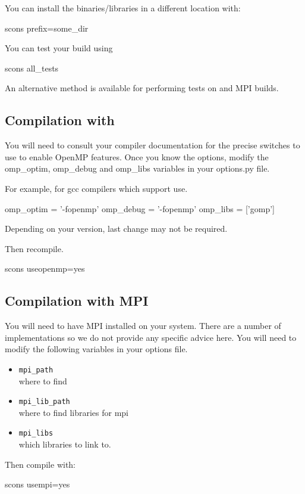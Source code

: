You can install the binaries/libraries in a different location with:
\begin{shellCode}
 scons prefix=some_dir
\end{shellCode}

You can test your build using 
\begin{shellCode}
scons all_tests
\end{shellCode}
An alternative method is available for performing tests on \openmp and MPI builds.

\subsection{Compilation with \openmp}
You will need to consult your compiler documentation for the precise switches to use to enable OpenMP features.
Once you know the options, modify the omp_optim, omp_debug and omp_libs variables in your options.py file.

For example, for gcc compilers which support \openmp use.
\begin{shellCode}
omp_optim		= '-fopenmp'
omp_debug		= '-fopenmp'
omp_libs		= ['gomp']
\end{shellCode}
Depending on your version, last change may not be required.

Then recompile.
\begin{shellCode}
 scons useopenmp=yes
\end{shellCode}

\subsection{Compilation with MPI}
You will need to have MPI installed on your system.
There are a number of implementations so we do not provide any specific advice here.
You will need to modify the following variables in your options file.
\begin{itemize}
 \item \texttt{mpi_path} \\
	where to find 
\item \texttt{mpi_lib_path} \\
	where to find libraries for mpi
\item \texttt{mpi_libs} \\
	which libraries to link to.
\end{itemize}

Then compile with:
\begin{shellCode}
 scons usempi=yes
\end{shellCode}

